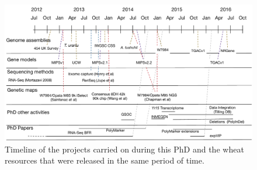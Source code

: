 \begin{landscape}
 \begin{figure}
  \centering
  \includegraphics[height=0.9\textheight]{Introduction/RicardoPhdTimelineV1.pdf}
  \caption[PhD timeline.]{Timeline of the projects carried on during this PhD and the wheat resources that were released in the same period of time. }
  \label{fig:intro:timeline}
 \end{figure}
\end{landscape}



